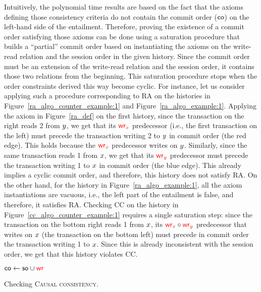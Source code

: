 Intuitively, the polynomial time results are based on the fact that the axioms defining those consistency criteria do not contain the commit order ($\co$) on the left-hand side of the entailment. Therefore, proving the existence of a commit order satisfying those axioms can be done using a saturation procedure that builds a ``partial'' commit order based on instantiating the axioms on the write-read relation and the session order in the given history. Since the commit order must be an extension of the write-read relation and the session order, it contains those two relations from the beginning. 
This saturation procedure stops when the order constraints derived this way become cyclic. For instance, let us consider applying such a procedure corresponding to RA on the histories in Figure~\ref{ra_algo_counter_example:1} and Figure~\ref{ra_algo_example:1}. Applying the axiom in Figure~\ref{ra_def} on the first history, since the transaction on the right reads 2 from $\yvar$, we get that its $\wro[\xvar]$ predecessor (i.e., the first transaction on the left) must precede the transaction writing 2 to $\yvar$ in commit order (the red edge). This holds because the $\wro[\xvar]$ predecessor writes on $\yvar$. Similarly, since the same transaction reads 1 from $\xvar$, we get that its $\wro[\yvar]$ predecessor must precede the transaction writing 1 to $\xvar$ in commit order (the blue edge). This already implies a cyclic commit order, and therefore, this history does not satisfy RA. On the other hand, for the history in Figure~\ref{ra_algo_example:1}, all the axiom instantiations are vacuous, i.e., the left part of the entailment is false, and therefore, it satisfies RA. Checking CC on the history in Figure~\ref{cc_algo_counter_example:1} requires a single saturation step: since the transaction on the bottom right reads 1 from $\xvar$, its $\wro[\xvar]\circ\wro[\yvar]$ predecessor that writes on $\xvar$ (the transaction on the bottom left) must precede in commit order the transaction writing 1 to $\xvar$. Since this is already inconsistent with the session order, we get that this history violates CC.

\begin{algorithm}[t]
{\footnotesize
 \BlankLine
  {
  \;
 }
 $\co \leftarrow \so\cup\wro$\;
 }
 \caption{Checking \textsc{Causal consistency}.}
 \label{ccalgo:1}
\end{algorithm}

